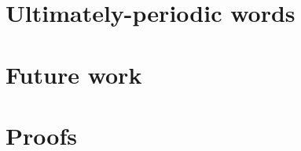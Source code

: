 \documentclass[orivec]{llncs}
\begin{document}
\section{Ultimately-periodic words}\label{sec:up-words}



\section{Future work}\label{sec:future-work}








\appendix
\section{Proofs}

\end{document}

